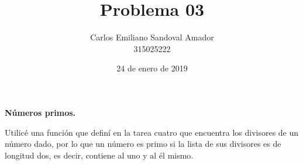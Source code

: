 \documentclass[letterpaper, 12pt, oneside]{article}%
\title{Problema 03}
\author{Carlos Emiliano Sandoval Amador \\ 315025222}
\date{24 de enero de 2019}
\begin{document}
	\maketitle
	\begin{center}
		\textbf{\large Números primos.}
	\end{center}
	Utilicé una función que definí en la tarea cuatro que encuentra los divisores de un número dado, por lo que un número es primo si la lista de sus divisores es de longitud dos, es decir, contiene al uno y al él mismo.
\end{document}
